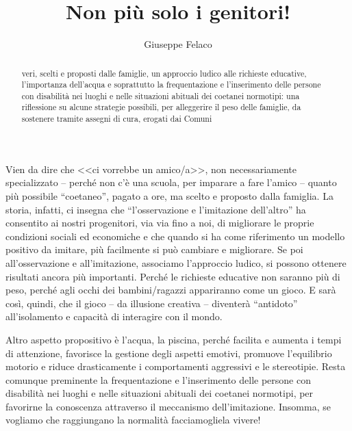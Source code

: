 \author{Giuseppe Felaco}
\title{Non più solo i genitori!}
\label{cha:felaco190413}
\begin{abstract}
 veri, scelti e proposti dalle famiglie, un approccio ludico alle richieste educative, l'importanza dell'acqua e soprattutto la frequentazione e l'inserimento delle persone con disabilità nei luoghi e nelle situazioni abituali dei coetanei normotipi: una riflessione su alcune strategie possibili, per alleggerire il peso delle famiglie, da sostenere tramite assegni di cura, erogati dai Comuni
\end{abstract}
\maketitle

 Vien da dire che <<ci vorrebbe un amico/a>>, non necessariamente specializzato – perché non c'è una scuola, per imparare a fare l'amico – quanto più possibile “coetaneo”, pagato a ore, ma scelto e proposto dalla famiglia.
La storia, infatti, ci insegna che “l'osservazione e l'imitazione dell'altro” ha consentito ai nostri progenitori, via via fino a noi, di migliorare le proprie condizioni sociali ed economiche e che quando si ha come riferimento un modello positivo da imitare, più facilmente si può cambiare e migliorare. Se poi all'osservazione e all'imitazione, associamo l'approccio ludico, si possono ottenere risultati ancora più importanti. Perché le richieste educative non saranno più di peso, perché agli occhi dei bambini/ragazzi appariranno come un gioco. E sarà così, quindi, che il gioco – da illusione creativa – diventerà “antidoto” all'isolamento e capacità di interagire con il mondo.

Altro aspetto propositivo è l'acqua, la piscina, perché facilita e aumenta i tempi di attenzione, favorisce la gestione degli aspetti emotivi, promuove l'equilibrio motorio e riduce drasticamente i comportamenti aggressivi e le stereotipie. Resta comunque preminente la frequentazione e l'inserimento delle persone con disabilità nei luoghi e nelle situazioni abituali dei coetanei normotipi, per favorirne la conoscenza attraverso il meccanismo dell'imitazione.
Insomma, se vogliamo che raggiungano la normalità facciamogliela vivere!


